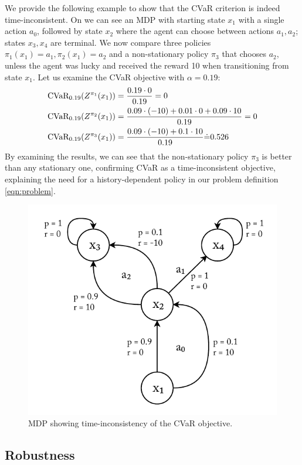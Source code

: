 We provide the following example to show that the CVaR criterion is indeed time-inconsistent. On  we can see an MDP with starting state $x_1$ with a single action $a_0$, followed by state $x_2$ where the agent can choose between actions $a_1, a_2$; states $x_3, x_4$ are terminal. We now compare three policies $\pi_1(x_1)=a_1, \pi_2(x_1)=a_2$ and a non-stationary policy $\pi_3$ that chooses $a_2$, unless the agent was lucky and received the reward 10 when transitioning from state $x_1$.
Let us examine the CVaR objective with $\alpha=0.19$: 
\begin{align*}
&\text{CVaR}_{0.19}(Z^{\pi_1}(x_1))=\frac{0.19 \cdot 0}{0.19} = 0\\
&\text{CVaR}_{0.19}(Z^{\pi_2}(x_1))=\frac{0.09\cdot (-10) + 0.01 \cdot 0 + 0.09 \cdot 10}{0.19}=0\\
&\text{CVaR}_{0.19}(Z^{\pi_3}(x_1))=\frac{0.09 \cdot (-10)+ 0.1 \cdot 10}{0.19} \dot{=} 0.526
\end{align*}
By examining the results, we can see that the non-stationary policy $\pi_3$ is better than any stationary one, confirming CVaR as a time-inconsistent objective, explaining the need for a history-dependent policy in our problem definition \ref{eqn:problem}.

\begin{figure}
\center
\includegraphics[width=0.6\linewidth]{gfx/time.pdf}
\caption{MDP showing time-inconsistency of the CVaR objective.}
\label{fig:time-consistency}
\end{figure}

\subsection{Robustness}

